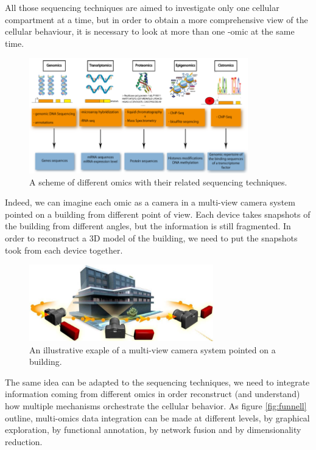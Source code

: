 All those sequencing techniques are aimed to investigate only one cellular compartment at a time, but in order to obtain a more comprehensive view of the cellular behaviour, it is necessary to look at more than one -omic at the same time.

\begin{figure}[h]
\centering
\includegraphics[width=9.5cm, keepaspectratio]{img/intro/omics.png}
\caption[Omics Representation]{A scheme of different omics with their related sequencing techniques.}
\label{fig:omics}
\end{figure}

Indeed, we can imagine each omic as a camera in a multi-view camera system pointed on a building from different point of view.
Each device takes snapshots of the building from different angles, but the information is still fragmented.
In order to reconstruct a 3D model of the building, we need to put the snapshots took from each device together.

\begin{figure}[h]
\centering
\includegraphics[width=8cm, keepaspectratio]{img/intro/cameras.png}
\caption[Integration cameras]{An illustrative exaple of a multi-view camera system pointed on a building.}
\label{fig:cameras}
\end{figure}

The same idea can be adapted to the sequencing techniques, we need to integrate information coming from different omics in order reconstruct (and understand) how multiple mechanisms orchestrate the cellular behavior.
As figure \ref{fig:funnell} outline, multi-omics data integration can be made at different levels, by graphical exploration, by functional annotation, by network fusion and by dimensionality reduction.

